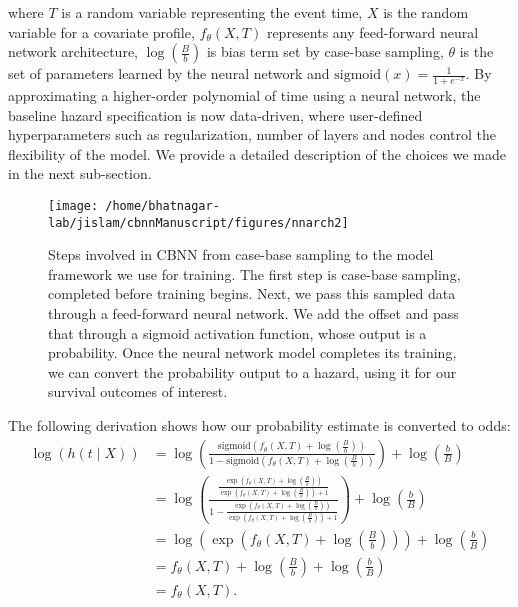 \documentclass[AMA,STIX1COL,]{WileyNJD-v2}
\begin{document}
where \(T\) is a random variable representing the event time, \(X\) is
the random variable for a covariate profile, \(f_{\theta}(X, T)\)
represents any feed-forward neural network architecture,
\(\log\left(\frac{B}{b}\right)\) is bias term set by case-base sampling,
\(\theta\) is the set of parameters learned by the neural network and
\(\mathrm{sigmoid}(x)=\frac{1}{1+e^{-x}}\). By approximating a
higher-order polynomial of time using a neural network, the baseline
hazard specification is now data-driven, where user-defined
hyperparameters such as regularization, number of layers and nodes
control the flexibility of the model. We provide a detailed description
of the choices we made in the next sub-section.

\begin{figure}

{\centering \texttt{[image: /home/bhatnagar-lab/jislam/cbnnManuscript/figures/nnarch2]} 

}

\caption{Steps involved in CBNN from case-base sampling to the model framework we use for training. The first step is case-base sampling, completed before training begins. Next, we pass this sampled data through a feed-forward neural network. We add the offset and pass that through a sigmoid activation function, whose output is a probability. Once the neural network model completes its training, we can convert the probability output to a hazard, using it for our survival outcomes of interest.}\label{fig:NNarch}
\end{figure}

The following derivation shows how our probability estimate is converted
to odds: \begin{align*}
 \log\left( h(t \mid X) \right) &= \log\left(\frac{\mathrm{sigmoid}\left(f_{\theta}(X, T) + \log\left(\frac{B}{b}\right)\right)}{1-\mathrm{sigmoid}\left(f_{\theta}(X, T) + \log\left(\frac{B}{b}\right)\right)}\right) + \log\left(\frac{b}{B}\right) \\
 &= \log\left( \frac{\frac{\exp\left(f_{\theta}(X, T) + \log\left(\frac{B}{b}\right)\right)}{\exp\left(f_{\theta}(X, T) + \log\left(\frac{B}{b}\right)\right)+1}}{1-\frac{\exp\left(f_{\theta}(X, T) + \log\left(\frac{B}{b}\right)\right)}{\exp\left(f_{\theta}(X, T) + \log\left(\frac{B}{b}\right)\right)+1}}\right) + \log\left(\frac{b}{B}\right) \\
 &= \log\left(\exp\left( f_{\theta}(X, T) + \log\left(\frac{B}{b}\right) \right) \right) + \log\left(\frac{b}{B}\right) \\
 &= f_{\theta}(X, T) + \log\left(\frac{B}{b}\right) + \log\left(\frac{b}{B}\right) \\
&= f_{\theta}(X, T). 
\end{align*}
\end{document}
